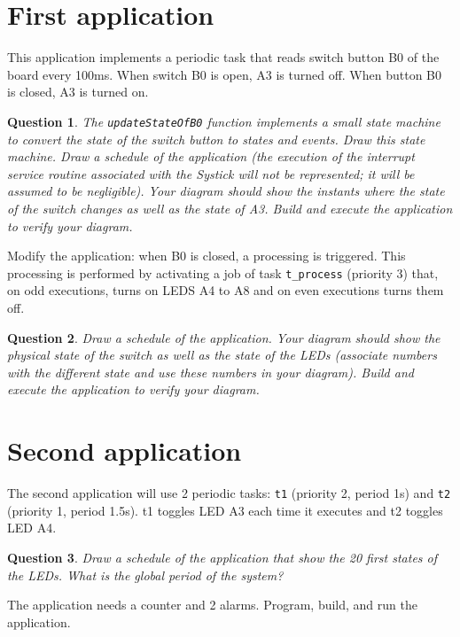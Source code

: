 \documentclass[11pt]{report}
\newtheorem{ex}{Question}
\begin{document}
\section{First application}

This application implements a periodic task that reads switch button B0 of the board every 100ms.
When switch B0 is open, A3 is turned off.
When button B0 is closed, A3 is turned on.

\begin{ex}
    The \texttt{updateStateOfB0} function implements a small state machine to convert the state of the switch button to states and events.
    Draw this state machine.
    Draw a schedule of the application (the execution of the interrupt service routine associated with the Systick will not be represented; it will be assumed to be negligible).
    Your diagram should show the instants where the state of the switch changes as well as the state of A3.
    Build and execute the application to verify your diagram.
\end{ex}

Modify the application: when B0 is closed, a processing is triggered.
This processing is performed by activating a job of task \texttt{t_process} (priority 3) that, on odd executions, turns on LEDS A4 to A8 and on even executions turns them off.
\begin{ex}
Draw a schedule of the application.
Your diagram should show the physical state of the switch as well as the state of the LEDs (associate numbers with the different state and use these numbers in your diagram).
Build and execute the application to verify your diagram.
\end{ex}


\section{Second application}

The second application will use 2 periodic tasks: \texttt{t1} (priority 2, period 1s) and \texttt{t2} (priority 1, period 1.5s). t1 toggles LED A3 each time it executes and t2 toggles LED A4.

\begin{ex}
    Draw a schedule of the application that show the 20 first states of the LEDs.
    What is the global period of the system?
\end{ex}

The application needs a counter and 2 alarms. Program, build, and run the application.
\end{document}
